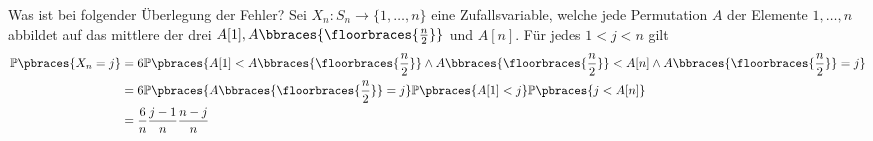 \begin{solution}
	Was ist bei folgender Überlegung der Fehler? Sei $X_n: S_n \to \{1, \dots, n\}$ eine Zufallsvariable, welche jede Permutation $A$ der Elemente $1, \dots, n$ abbildet auf das mittlere der drei $A[1], A\bbraces{\floorbraces{\frac{n}{2}}}$ und $A[n]$. Für jedes $1 < j < n$ gilt
	\begin{align*}
		\mathbb{P}\pbraces{X_n = j} &= 6 \mathbb{P}\pbraces{A[1] < A\bbraces{\floorbraces{\frac{n}{2}}} \land A\bbraces{\floorbraces{\frac{n}{2}}} < A[n] \land A\bbraces{\floorbraces{\frac{n}{2}}} = j} \\
		&= 6 \mathbb{P}\pbraces{A\bbraces{\floorbraces{\frac{n}{2}}} = j} \mathbb{P}\pbraces{A[1] < j} \mathbb{P}\pbraces{j < A[n]} \\
		&= \frac{6}{n}\frac{j - 1}{n}\frac{n - j}{n} 
	\end{align*}
\end{solution}
